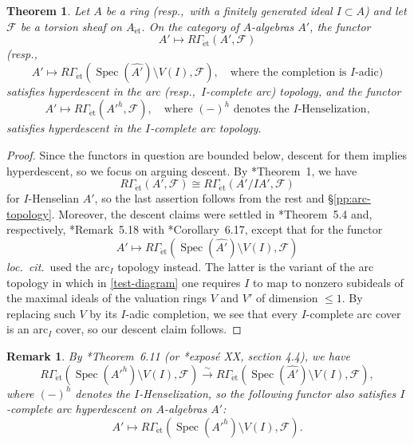 \documentclass[11pt, reqno]{amsart}
\newcommand{\sF}{\mathscr{F}}
\DeclareMathOperator{\Spec}{Spec}		%
\newcommand{\et}{\mathrm{\acute{e}t}}	%
\newcommand{\isomto}{\overset{\sim}{\longrightarrow}}
\newcommand{\wh}{\widehat}
\providecommand{\up}[1]{{\upshape(}#1{\upshape)}}
\providecommand{\qxq}[1]{\quad\text{#1}\quad}
\providecommand{\qx}[1]{\quad\text{#1}}
\newcommand{\tst}{\textstyle}
\newcommand{\brem}{\begin{rem}}
\newcommand{\erem}{\end{rem}}
\numberwithin{equation}{numberingbase}
\theoremstyle{thms}
\newtheorem{theorem}[numberingbase]{Theorem}
\theoremstyle{claims}
\theoremstyle{defs}
\newtheorem{rem}[numberingbase]{Remark}
\theoremstyle{thms}
\theoremstyle{defs}
\theoremstyle{subsection-tweak}
\theoremstyle{subsection-tweak}
\begin{document}
\begin{theorem}\label{arc-descent}
Let $A$ be a ring \up{resp.,~with a finitely generated ideal $I \subset A$} and let $\sF$ be a torsion sheaf on $A_\et$. On the category of $A$-algebras $A'$, the functor
\[
\tst A' \mapsto R\Gamma_\et(A', \sF)
\]
{\upshape(}resp., 
\[
A' \mapsto R\Gamma_\et(\Spec(\wh{A'})\setminus V(I), \sF), \qx{where the completion is $I$-adic})
\]
satisfies hyperdescent in the arc \up{resp.,~$I$-complete arc} topology, and the functor 
\[
A' \mapsto R\Gamma_\et(A'^h, \sF), \qx{where $(-)^h$ denotes the $I$-Henselization,}
\]
satisfies hyperdescent in the $I$-complete arc topology.
\end{theorem}

\begin{proof} 
Since the functors in question are bounded below, descent for them implies hyperdescent, so we focus on arguing descent. 
By \cite{Gab94a}*{Theorem~1}, we have 
\[
R\Gamma_\et(A', \sF) \cong R\Gamma_\et(A'/IA', \sF)
\]
for $I$-Henselian $A'$, so the last assertion follows from the rest and \S\ref{pp:arc-topology}. Moreover, the descent claims were settled in \cite{BM20}*{Theorem~5.4} and, respectively, \cite{Mat20}*{Remark~5.18} with \cite{BM20}*{Corollary~6.17}, except that for the functor 
\[
A' \mapsto R\Gamma_\et(\Spec(\wh{A'})\setminus V(I), \sF)
\]
\emph{loc.~cit.}~used the arc$_I$ topology instead. The latter is the variant of the arc topology in which in \eqref{test-diagram} one requires $I$ to map to nonzero subideals of the maximal ideals of the  valuation rings $V$ and $V'$ of dimension $\le 1$. By replacing such $V$ by its $I$-adic completion, we see that every $I$-complete arc cover is an arc$_I$ cover, so our descent claim follows.
\end{proof}


\brem \label{BM-hens-comp}
By \cite{BM20}*{Theorem~6.11} (or \cite{ILO14}*{expos\'{e} XX, section 4.4}), we have 
\[
\tst %
R\Gamma_\et(\Spec(A'^h)\setminus V(I),\sF) \isomto R\Gamma_\et(\Spec(\widehat{A'}) \setminus V(I),\sF),
\]
where $(-)^h$ denotes the $I$-Henselization, so the following functor also satisfies $I$-complete arc hyperdescent on $A$-algebras $A'$:
\[
A' \mapsto R\Gamma_\et(\Spec(A'^h)\setminus V(I), \sF).
\]
\erem
\end{document}
